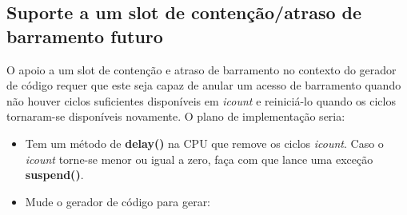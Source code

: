 \documentclass[letterpaper,10pt,brazil]{sphinxmanual}
\begin{document}
\subsection{Suporte a um slot de contenção/atraso de barramento futuro}
\label{techspecs/m6502:suporte-a-um-slot-de-contencao-atraso-de-barramento-futuro}
O apoio a um slot de contenção e atraso de barramento no contexto do
gerador de código requer que este seja capaz de anular um acesso de
barramento quando não houver ciclos suficientes disponíveis em \emph{icount}
e reiniciá-lo quando os ciclos tornaram-se disponíveis novamente.
O plano de implementação seria:
\begin{itemize}
\item {} 
Tem um método de \textbf{delay()} na CPU que remove os ciclos \emph{icount}.
Caso o \emph{icount} torne-se menor ou igual a zero, faça com que lance uma
exceção \textbf{suspend()}.

\item {} 
Mude o gerador de código para gerar:

\end{itemize}
\end{document}
